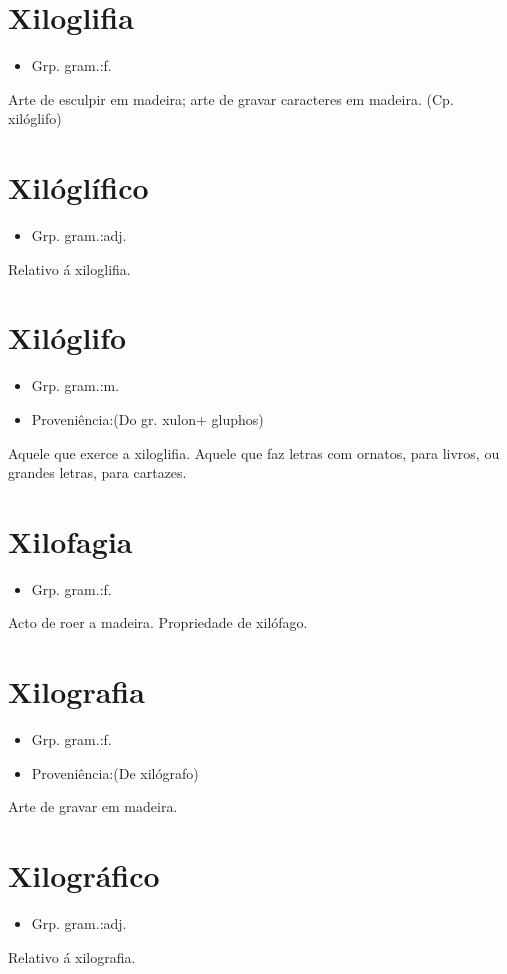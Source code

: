 \section{Xiloglifia}
\begin{itemize}
\item {Grp. gram.:f.}
\end{itemize}
Arte de esculpir em madeira; arte de gravar caracteres em madeira.
(Cp. \textunderscore xilóglifo\textunderscore )
\section{Xilóglífico}
\begin{itemize}
\item {Grp. gram.:adj.}
\end{itemize}
Relativo á xiloglifia.
\section{Xilóglifo}
\begin{itemize}
\item {Grp. gram.:m.}
\end{itemize}
\begin{itemize}
\item {Proveniência:(Do gr. \textunderscore xulon\textunderscore  + \textunderscore gluphos\textunderscore )}
\end{itemize}
Aquele que exerce a xiloglifia.
Aquele que faz letras com ornatos, para livros, ou grandes letras, para cartazes.
\section{Xilofagia}
\begin{itemize}
\item {Grp. gram.:f.}
\end{itemize}
Acto de roer a madeira.
Propriedade de xilófago.
\section{Xilografia}
\begin{itemize}
\item {Grp. gram.:f.}
\end{itemize}
\begin{itemize}
\item {Proveniência:(De \textunderscore xilógrafo\textunderscore )}
\end{itemize}
Arte de gravar em madeira.
\section{Xilográfico}
\begin{itemize}
\item {Grp. gram.:adj.}
\end{itemize}
Relativo á xilografia.
